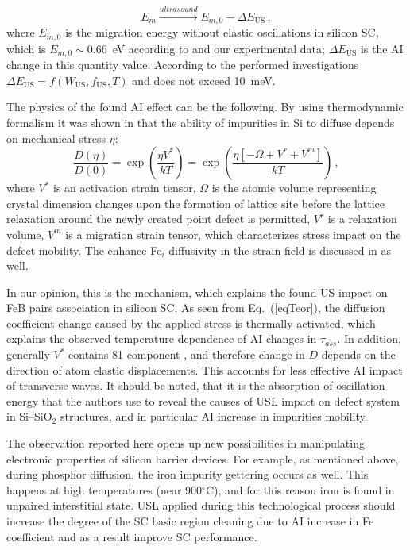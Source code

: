 \begin{equation}
\label{eqEmUs}
E_m \xrightarrow{ultrasound} E_{m,0}-\Delta E_\mathrm{US}\,,
\end{equation}
where $E_{m,0}$ is the migration energy without elastic oscillations in silicon SC,
which is $E_{m,0}\sim0.66$~eV according to \cite{FeBAssJAP2014,FeBkinAPL2008} and our experimental data;
$\Delta E_\mathrm{US}$ is the AI change in this quantity value.
According to the performed investigations  $\Delta E_\mathrm{US}=f(W_\mathrm{US},f_\mathrm{US},T)$ and does not exceed 10~meV.

The physics of the found AI effect can be the following.
By using thermodynamic formalism it was shown in \cite{AZIZ2001} that the ability of
impurities in Si to diffuse depends on mechanical stress $\eta$:
\begin{equation}
\label{eqTeor}
\frac{D(\eta)}{D(0)}=\exp\left(\frac{\eta V^*}{kT}\right)=
\exp\left(\frac{\eta [-\Omega+V^r+V^m]}{kT}\right)\,,
\end{equation}
where
$V^*$ is an activation strain tensor,
$\Omega$ is the atomic volume representing  crystal dimension changes
upon the formation of lattice site before the lattice relaxation
around the newly created point defect is permitted,
$V^r$ is a relaxation volume,
$V^m$ is a migration strain tensor, which characterizes stress impact on the defect mobility.
The enhance Fe$_i$ diffusivity in the strain field is discussed in \cite{FeStrain} as well.

In our opinion, this is the mechanism, which explains the found US impact on FeB pairs association in silicon SC.
As seen from Eq.~(\ref{eqTeor}), the diffusion coefficient change caused
by the applied stress is thermally  activated, which explains the observed
temperature dependence of AI changes in $\tau_{ass}$.
In addition, generally $V^*$ contains 81 component  \cite{AZIZ2001},
and therefore change in $D$ depends on the direction of atom elastic displacements.
This accounts for less effective AI impact of transverse waves.
It should be noted, that it is the absorption of oscillation energy that the authors \cite{GORB2020,UST:Medvid}
use to reveal the causes of USL impact on defect system in Si--SiO$_2$ structures,
and in particular AI increase in impurities mobility.

The observation reported here opens up new possibilities in manipulating electronic
properties of silicon barrier devices.
For example, as mentioned above, during phosphor diffusion, the iron impurity gettering occurs as well.
This happens at high temperatures (near 900$^\circ$C),
and for this reason iron is found in unpaired interstitial state.
USL applied during this technological process should increase the degree of the SC basic region
cleaning due to AI increase in Fe coefficient and as a result improve SC performance.

